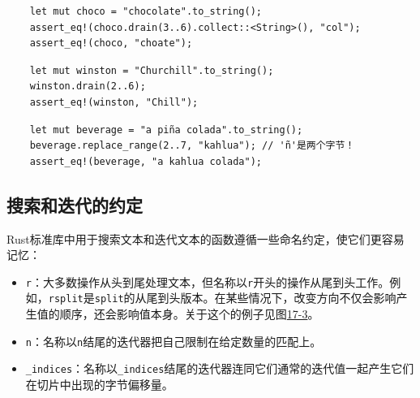 

\begin{verbatim}
    let mut choco = "chocolate".to_string();
    assert_eq!(choco.drain(3..6).collect::<String>(), "col");
    assert_eq!(choco, "choate");
\end{verbatim}


\begin{verbatim}
    let mut winston = "Churchill".to_string();
    winston.drain(2..6);
    assert_eq!(winston, "Chill");
\end{verbatim}

\begin{verbatim}
    let mut beverage = "a piña colada".to_string();
    beverage.replace_range(2..7, "kahlua"); // 'ñ'是两个字节！
    assert_eq!(beverage, "a kahlua colada");
\end{verbatim}

\subsection{搜索和迭代的约定}

Rust标准库中用于搜索文本和迭代文本的函数遵循一些命名约定，使它们更容易记忆：
\begin{itemize}
    \item \texttt{r}：大多数操作从头到尾处理文本，但名称以\texttt{r}开头的操作从尾到头工作。例如，\texttt{rsplit}是\texttt{split}的从尾到头版本。在某些情况下，改变方向不仅会影响产生值的顺序，还会影响值本身。关于这个的例子见图\hyperref[f17-3]{17-3}。
    \item \texttt{n}：名称以\texttt{n}结尾的迭代器把自己限制在给定数量的匹配上。
    \item \texttt{\_indices}：名称以\texttt{\_indices}结尾的迭代器连同它们通常的迭代值一起产生它们在切片中出现的字节偏移量。
\end{itemize}

